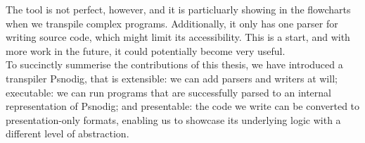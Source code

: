 The tool is not perfect, however, and it is particluarly showing in the flowcharts when we transpile complex programs. Additionally, it only has one parser for writing source code, which might limit its accessibility. This is a start, and with more work in the future, it could potentially become very useful. \\

To succinctly summerise the contributions of this thesis, we have introduced a transpiler Psnodig, that is extensible: we can add parsers and writers at will; executable: we can run programs that are successfully parsed to an internal representation of Psnodig; and presentable: the code we write can be converted to presentation-only formats, enabling us to showcase its underlying logic with a different level of abstraction.
